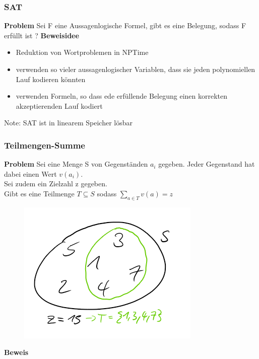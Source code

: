 \documentclass[12pt,a4paper]{article}
\begin{document}
\subsubsection{SAT}
\textbf{Problem}
Sei F eine Aussagenlogische Formel, gibt es eine Belegung, sodass F erfüllt ist ?
\textbf{Beweisidee}
\begin{itemize}
\item Reduktion von Wortproblemen in NPTime
\item verwenden so vieler aussagenlogischer Variablen, dass sie jeden polynomiellen Lauf kodieren könnten
\item verwenden Formeln, so dass ede erfüllende Belegung einen korrekten akzeptierenden Lauf kodiert
\end{itemize}
Note: SAT ist in linearem Speicher lösbar

\subsubsection{Teilmengen-Summe}
\textbf{Problem}
Sei eine Menge S von Gegenständen $a_i$ gegeben. Jeder Gegenstand hat dabei einen Wert $v(a_i)$.\\
Sei zudem ein Zielzahl z gegeben.\\
Gibt es eine Teilmenge $T \subseteq S$ sodass $\sum_{a\in T} v(a) = z$
\begin{figure}[H]
\includegraphics[scale=0.5]{./resources/teilmengen_summe.png}
\end{figure}
\textbf{Beweis}\\
\end{document}
